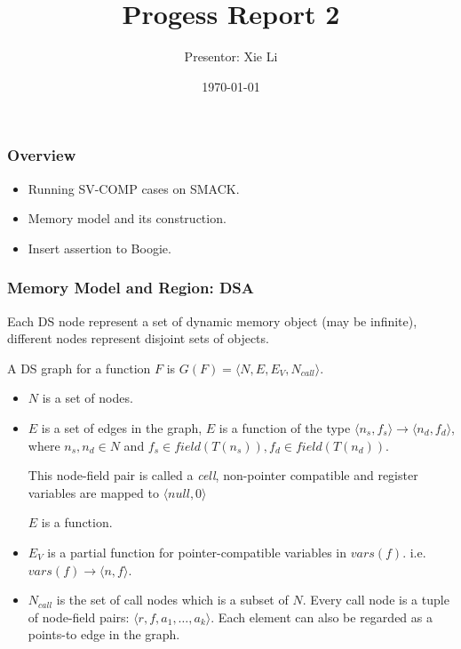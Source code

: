 \documentclass[aspectratio=1610, 13pt]{beamer}
\title{Progess Report 2}
\date{\today}
\author{Presentor: Xie Li}
\begin{document}
\maketitle

\begin{frame}\frametitle{Overview}
\begin{itemize}
\item Running SV-COMP cases on SMACK.
\item Memory model and its construction.
\item Insert assertion to Boogie.
\end{itemize}
\end{frame}

\begin{frame}\frametitle{}

\end{frame}


\begin{frame}\frametitle{Memory Model and Region: DSA}

Each DS node represent a set of dynamic memory object (may be infinite), different nodes represent disjoint sets of objects.

\begin{definition}
A DS graph for a function $F$ is $G(F) = \langle N, E, E_V, N_{call}\rangle$.
\begin{itemize}
\item $N$ is a set of nodes.
\item $E$ is a set of edges in the graph, $E$ is a function of the type $\langle n_s, f_s\rangle \rightarrow \langle n_d, f_d\rangle$, where $n_s, n_d \in N$ and $f_s\in field(T(n_s)), f_d\in field(T(n_d))$.

This node-field pair is called a \emph{cell}, non-pointer compatible and register variables are mapped to $\langle null, 0\rangle$

$E$ is a function.
\item $E_V$ is a partial function for pointer-compatible variables in $vars(f)$. i.e. $vars(f) \rightarrow \langle
n, f\rangle$.

\item $N_{call}$ is the set of call nodes which is a subset of $N$. Every call node is a tuple of node-field pairs: $\langle r, f, a_1, \ldots, a_k\rangle$. Each element can also be regarded as a points-to edge in the graph.

\end{itemize}
\end{definition}

\end{frame}
\end{document}
